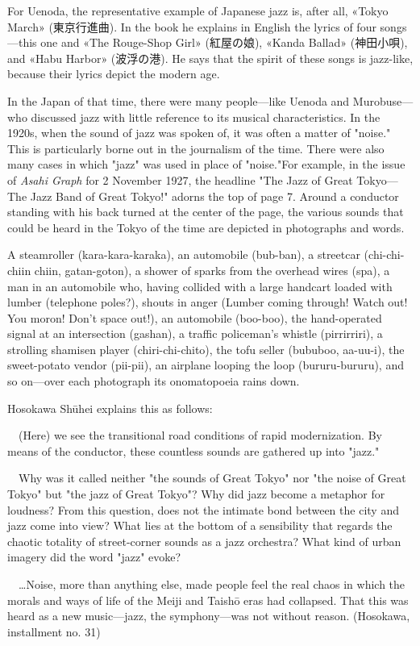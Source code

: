 For Uenoda, the representative example of Japanese jazz is, after all, «Tokyo March» (東京行進曲). In the book he explains in English the lyrics of four songs—this one and «The Rouge-Shop Girl» (紅屋の娘), «Kanda Ballad» (神田小唄), and «Habu Harbor» (波浮の港). He says that the spirit of these songs is jazz-like, because their lyrics depict the modern age.

In the Japan of that time, there were many people—like Uenoda and Murobuse—who discussed jazz with little reference to its musical characteristics. In the 1920s, when the sound of jazz was spoken of, it was often a matter of "noise." This is particularly borne out in the journalism of the time. There were also many cases in which "jazz" was used in place of "noise."For example, in the issue of \textit{Asahi Graph} for 2 November 1927, the headline "The Jazz of Great Tokyo—The Jazz Band of Great Tokyo!" adorns the top of page 7. Around a conductor standing with his back turned at the center of the page, the various sounds that could be heard in the Tokyo of the time are depicted in photographs and words.

A steamroller (kara-kara-karaka), an automobile (bub-ban), a streetcar (chi-chi-chiin chiin, gatan-goton), a shower of sparks from the overhead wires (spa), a man in an automobile who, having collided with a large handcart loaded with lumber (telephone poles?), shouts in anger (Lumber coming through! Watch out! You moron! Don't space out!), an automobile (boo-boo), the hand-operated signal at an intersection (gashan), a traffic policeman's whistle (pirrirriri), a strolling shamisen player (chiri-chi-chito), the tofu seller (bububoo, aa-uu-i), the sweet-potato vendor (pii-pii), an airplane looping the loop (bururu-bururu), and so on—over each photograph its onomatopoeia rains down.

Hosokawa Shūhei explains this as follows:

\begin{gquote}
　(Here) we see the transitional road conditions of rapid modernization. By means of the conductor, these countless sounds are gathered up into "jazz."\par{}　Why was it called neither "the sounds of Great Tokyo" nor "the noise of Great Tokyo" but "the jazz of Great Tokyo"? Why did jazz become a metaphor for loudness? From this question, does not the intimate bond between the city and jazz come into view? What lies at the bottom of a sensibility that regards the chaotic totality of street-corner sounds as a jazz orchestra? What kind of urban imagery did the word "jazz" evoke?\par{}　…Noise, more than anything else, made people feel the real chaos in which the morals and ways of life of the Meiji and Taishō eras had collapsed. That this was heard as a new music—jazz, the symphony—was not without reason. (Hosokawa, installment no. 31)
\end{gquote}

